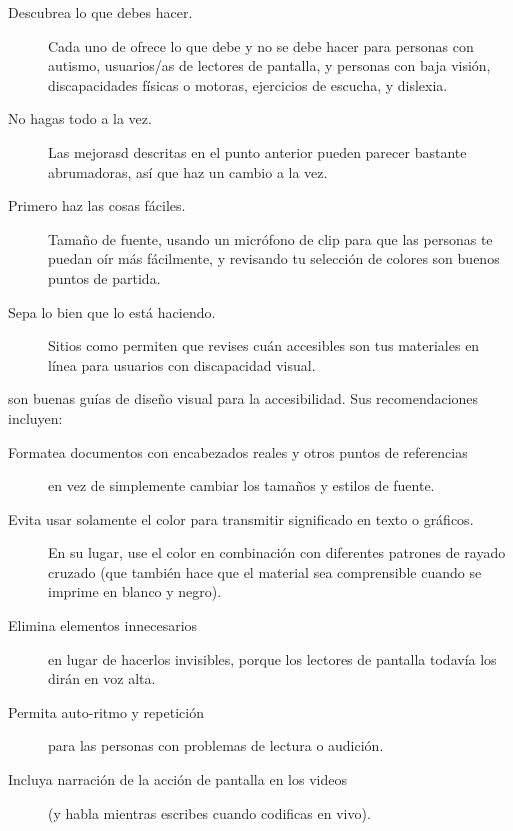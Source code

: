 \begin{description}

\item[Descubrea lo que debes hacer.]
   Cada uno de 
  ofrece lo que debe y no se debe hacer para personas con autismo,
  usuarios/as de lectores de pantalla,
  y personas con baja visión,
  discapacidades físicas o motoras,
  ejercicios de escucha,
  y dislexia.

\item[No hagas todo a la vez.]
  Las mejorasd descritas en el punto anterior pueden parecer bastante abrumadoras,
  así que haz un cambio a la vez.

\item[Primero haz las cosas fáciles.]
  Tamaño de fuente,
  usando un micrófono de clip para que las personas te puedan oír más fácilmente,
  y revisando tu selección de colores son buenos puntos de partida.

\item[Sepa lo bien que lo está haciendo.]
  Sitios como  permiten que revises
  cuán accesibles son tus materiales en línea para usuarios con discapacidad visual.

\end{description}

\cite{Coom2012,Burg2015} son buenas guías de diseño visual para la accesibilidad.
Sus recomendaciones incluyen:

\begin{description}

\item[Formatea documentos con encabezados reales y otros puntos de referencias]
  en vez de simplemente cambiar los tamaños y estilos de fuente.

\item[Evita usar solamente el color para transmitir significado en texto o gráficos.]
  En su lugar, use el color en combinación con diferentes patrones de rayado cruzado
  (que también hace que el material sea comprensible cuando se imprime en blanco y negro).

\item[Elimina elementos innecesarios]
  en lugar de hacerlos invisibles,
  porque los lectores de pantalla todavía los dirán en voz alta.

\item[Permita auto-ritmo y repetición]
  para las personas con problemas de lectura o audición.

\item[Incluya narración de la acción de pantalla en los videos]
  (y habla mientras escribes cuando codificas en vivo).

\end{description}

